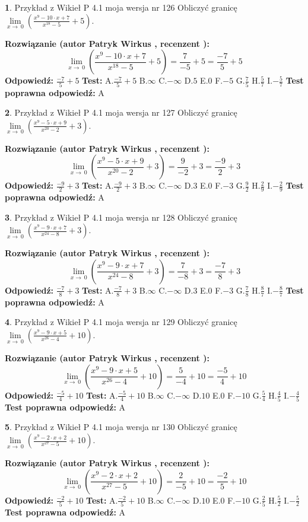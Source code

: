 \documentclass[12pt, a4paper]{article}
\theoremstyle{definition} %
\newtheorem{zad}{}
\newcommand{\zadStart}[1]{\begin{zad}#1\newline}
\newcommand{\zadStop}{\end{zad}}
\newcommand{\rozwStart}[2]{\noindent \textbf{Rozwiązanie (autor #1 , recenzent #2): }\newline}
\newcommand{\rozwStop}{\newline}
\newcommand{\odpStart}{\noindent \textbf{Odpowiedź:}\newline}
\newcommand{\odpStop}{\newline}
\newcommand{\testStart}{\noindent \textbf{Test:}\newline}
\newcommand{\testStop}{\newline}
\newcommand{\kluczStart}{\noindent \textbf{Test poprawna odpowiedź:}\newline}
\newcommand{\kluczStop}{\newline}
\begin{document}
\zadStart{Przykład z Wikieł P 4.1 moja wersja nr 126}
Obliczyć granicę $\lim\limits_{x\to\ 0}(\frac{x^{9}-10 \cdot x +7}{x^{18}-5}+5)$.
\zadStop
\rozwStart{Patryk Wirkus}{}
$$\lim\limits_{x\to\ 0}(\frac{x^{9}-10 \cdot x +7}{x^{18}-5}+5)=\frac{7}{-5}+5=\frac{-7}{5}+5$$
\rozwStop
\odpStart
$\frac{-7}{5}+5$
\odpStop
\testStart
A.$\frac{-7}{5}+5$
B.$\infty$
C.$-\infty$
D.$5$
E.$0$
F.$-5$
G.$\frac{7}{5}$
H.$\frac{5}{7}$
I.$-\frac{5}{7}$
\testStop
\kluczStart
A
\kluczStop



\zadStart{Przykład z Wikieł P 4.1 moja wersja nr 127}
Obliczyć granicę $\lim\limits_{x\to\ 0}(\frac{x^{9}-5 \cdot x +9}{x^{20}-2}+3)$.
\zadStop
\rozwStart{Patryk Wirkus}{}
$$\lim\limits_{x\to\ 0}(\frac{x^{9}-5 \cdot x +9}{x^{20}-2}+3)=\frac{9}{-2}+3=\frac{-9}{2}+3$$
\rozwStop
\odpStart
$\frac{-9}{2}+3$
\odpStop
\testStart
A.$\frac{-9}{2}+3$
B.$\infty$
C.$-\infty$
D.$3$
E.$0$
F.$-3$
G.$\frac{9}{2}$
H.$\frac{2}{9}$
I.$-\frac{2}{9}$
\testStop
\kluczStart
A
\kluczStop



\zadStart{Przykład z Wikieł P 4.1 moja wersja nr 128}
Obliczyć granicę $\lim\limits_{x\to\ 0}(\frac{x^{9}-9 \cdot x +7}{x^{24}-8}+3)$.
\zadStop
\rozwStart{Patryk Wirkus}{}
$$\lim\limits_{x\to\ 0}(\frac{x^{9}-9 \cdot x +7}{x^{24}-8}+3)=\frac{7}{-8}+3=\frac{-7}{8}+3$$
\rozwStop
\odpStart
$\frac{-7}{8}+3$
\odpStop
\testStart
A.$\frac{-7}{8}+3$
B.$\infty$
C.$-\infty$
D.$3$
E.$0$
F.$-3$
G.$\frac{7}{8}$
H.$\frac{8}{7}$
I.$-\frac{8}{7}$
\testStop
\kluczStart
A
\kluczStop



\zadStart{Przykład z Wikieł P 4.1 moja wersja nr 129}
Obliczyć granicę $\lim\limits_{x\to\ 0}(\frac{x^{9}-9 \cdot x +5}{x^{26}-4}+10)$.
\zadStop
\rozwStart{Patryk Wirkus}{}
$$\lim\limits_{x\to\ 0}(\frac{x^{9}-9 \cdot x +5}{x^{26}-4}+10)=\frac{5}{-4}+10=\frac{-5}{4}+10$$
\rozwStop
\odpStart
$\frac{-5}{4}+10$
\odpStop
\testStart
A.$\frac{-5}{4}+10$
B.$\infty$
C.$-\infty$
D.$10$
E.$0$
F.$-10$
G.$\frac{5}{4}$
H.$\frac{4}{5}$
I.$-\frac{4}{5}$
\testStop
\kluczStart
A
\kluczStop



\zadStart{Przykład z Wikieł P 4.1 moja wersja nr 130}
Obliczyć granicę $\lim\limits_{x\to\ 0}(\frac{x^{9}-2 \cdot x +2}{x^{27}-5}+10)$.
\zadStop
\rozwStart{Patryk Wirkus}{}
$$\lim\limits_{x\to\ 0}(\frac{x^{9}-2 \cdot x +2}{x^{27}-5}+10)=\frac{2}{-5}+10=\frac{-2}{5}+10$$
\rozwStop
\odpStart
$\frac{-2}{5}+10$
\odpStop
\testStart
A.$\frac{-2}{5}+10$
B.$\infty$
C.$-\infty$
D.$10$
E.$0$
F.$-10$
G.$\frac{2}{5}$
H.$\frac{5}{2}$
I.$-\frac{5}{2}$
\testStop
\kluczStart
A
\kluczStop
\end{document}
